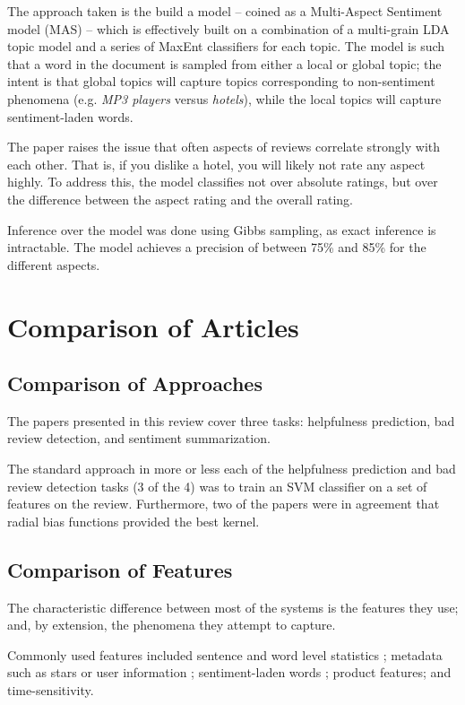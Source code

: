 \documentclass[12pt,letterpaper]{article}
\begin{document}
The approach taken is the build a model -- coined as a Multi-Aspect Sentiment model (MAS) --
	which is effectively built on a combination of a multi-grain LDA topic model and a series of MaxEnt
	classifiers for each topic.
The model is such that a word in the document is sampled from either a local or global topic;
	the intent is that global topics will capture topics corresponding to non-sentiment phenomena
	(e.g. {\em MP3 players} versus {\em hotels}), while the local topics will capture sentiment-laden
	words.

The paper raises the issue that often aspects of reviews correlate strongly with each other.
That is, if you dislike a hotel, you will likely not rate any aspect highly.
To address this, the model classifies not over absolute ratings, but over the difference between
	the aspect rating and the overall rating.

Inference over the model was done using Gibbs sampling, as exact inference is intractable.
The model achieves a precision of between 75\% and 85\% for the different aspects.


\section{Comparison of Articles}

\subsection{Comparison of Approaches}
The papers presented in this review cover three tasks: helpfulness prediction, bad review detection,
	and sentiment summarization. 

The standard approach in more or less each of the helpfulness prediction and bad review detection
	tasks (3 of the 4) was to train an SVM classifier on a set of features on the review.
Furthermore, two of the papers were in agreement that radial bias functions provided the best kernel.

\subsection{Comparison of Features}
The characteristic difference between most of the systems is the features they use; and, by extension,
	the phenomena they attempt to capture.

Commonly used features included sentence and word level statistics 
	\cite{2007liu-helpfulness} \cite{2006kim-helpfulness};
	metadata such as stars or user information \cite{2008liu-helpfulness} \cite{2006kim-helpfulness};
	sentiment-laden words \cite{2007liu-helpfulness} \cite{2008liu-helpfulness};
	product features;
	and time-sensitivity.
\end{document}
